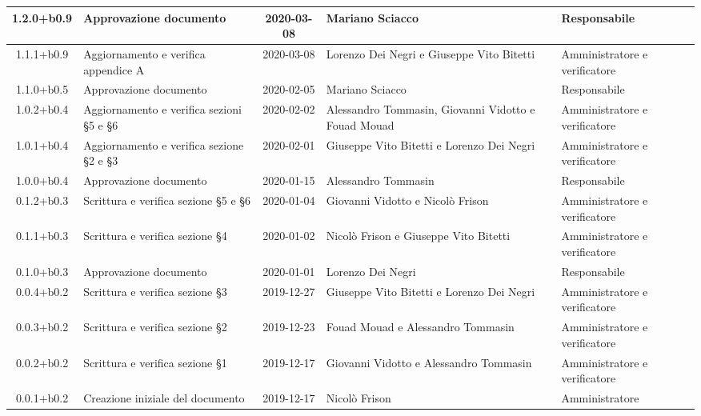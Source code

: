 \begin{center}
\begin{longtable}{|c|p{3.5cm}|c|p{3cm}|p{3cm}|}
	1.2.0+b0.9 & Approvazione documento & 2020-03-08 & Mariano Sciacco & Responsabile \\
	\hline
	1.1.1+b0.9 & Aggiornamento e verifica appendice A & 2020-03-08 & Lorenzo Dei Negri e Giuseppe Vito Bitetti & Amministratore e verificatore \\
	\hline
	1.1.0+b0.5 & Approvazione documento & 2020-02-05 & Mariano Sciacco & Responsabile \\
	\hline
	1.0.2+b0.4 & Aggiornamento e verifica sezioni \S5 e \S6 & 2020-02-02 & Alessandro Tommasin, Giovanni Vidotto e Fouad Mouad & Amministratore e verificatore \\
	\hline
	1.0.1+b0.4 & Aggiornamento e verifica sezione \S2 e \S3 & 2020-02-01 & Giuseppe Vito Bitetti e Lorenzo Dei Negri & Amministratore e verificatore \\
	\hline
	1.0.0+b0.4 & Approvazione documento & 2020-01-15 & Alessandro Tommasin & Responsabile \\
	\hline
	0.1.2+b0.3 & Scrittura e verifica sezione \S5 e \S6 & 2020-01-04 & Giovanni Vidotto e Nicolò Frison & Amministratore e verificatore \\
	\hline
	0.1.1+b0.3 &  Scrittura e verifica sezione \S4 & 2020-01-02 & Nicolò Frison e Giuseppe Vito Bitetti & Amministratore e verificatore \\
	\hline
	0.1.0+b0.3 & Approvazione documento & 2020-01-01 & Lorenzo Dei Negri & Responsabile \\
	\hline
	0.0.4+b0.2 & Scrittura e verifica sezione \S3 & 2019-12-27  & Giuseppe Vito Bitetti e Lorenzo Dei Negri & Amministratore e verificatore \\
	\hline
	0.0.3+b0.2 & Scrittura e verifica sezione \S2 & 2019-12-23 & Fouad Mouad e Alessandro Tommasin & Amministratore e verificatore \\
	\hline
	0.0.2+b0.2 & Scrittura e verifica sezione \S1 & 2019-12-17 & Giovanni Vidotto e Alessandro Tommasin & Amministratore e verificatore \\
	\hline
	0.0.1+b0.2 & Creazione iniziale del documento & 2019-12-17 & Nicolò Frison & Amministratore \\
	\hline

	\end{longtable}
\end{center}
